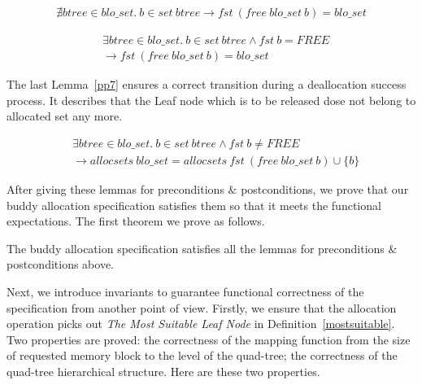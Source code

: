 \begin{lemma} 
\label{pp5}
\end{lemma}
\vspace{-7pt}
{\footnotesize
\begin{align*}
\nexists btree \in blo\_set.\ b \in set\ btree \longrightarrow fst\ (free\ blo\_set\ b) = blo\_set
\end{align*}
}
\vspace{-12pt}
	
\begin{lemma} 
\label{pp6}
\end{lemma}
\vspace{-7pt}
{\footnotesize
\begin{align*}
&\exists btree \in blo\_set.\ b \in set\ btree \wedge fst\ b = FREE \\
&\longrightarrow fst\ (free\ blo\_set\ b) = blo\_set
\end{align*}
}
\vspace{-12pt}

The last Lemma~\ref{pp7} ensures a correct transition during a deallocation success process. It describes that the Leaf node which is to be released dose not belong to allocated set any more.

\begin{lemma} 
\label{pp7}
\end{lemma}
\vspace{-7pt}
{\footnotesize
\begin{align*}
&\exists btree \in blo\_set.\ b \in set\ btree \wedge fst\ b \neq FREE \\ &\longrightarrow allocsets\ blo\_set = allocsets\ fst\ (free\ blo\_set\ b) \cup \lbrace b \rbrace
\end{align*}
}
\vspace{-12pt}

After giving these lemmas for preconditions $\&$ postconditions, we prove that our buddy allocation specification satisfies them so that it meets the functional expectations. The first theorem we prove as follows.

\begin{theorem}
The buddy allocation specification satisfies all the lemmas for preconditions $\&$ postconditions above.
\end{theorem}

Next, we introduce invariants to guarantee functional correctness of the specification from another point of view. Firstly, we ensure that the allocation operation picks out \emph{The Most Suitable Leaf Node} in Definition~\ref{mostsuitable}. Two properties are proved: the correctness of the mapping function from the size of requested memory block to the level of the quad-tree; the correctness of the quad-tree hierarchical structure. Here are these two properties.

